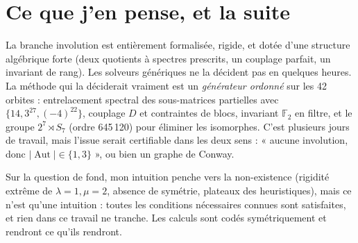 \documentclass[11pt,a4paper]{article}
\theoremstyle{definition}
\theoremstyle{remark}
\newcommand{\F}{\mathbb{F}}
\newcommand{\Aut}{\operatorname{Aut}}
\begin{document}
\section{Ce que j'en pense, et la suite}
La branche involution est entièrement formalisée, rigide, et dotée d'une structure algébrique forte (deux quotients à spectres prescrits, un couplage parfait,
un invariant de rang). Les solveurs génériques ne la décident pas en quelques heures. La méthode qui la déciderait vraiment est un \emph{générateur ordonné}
sur les 42 orbites : entrelacement spectral des sous-matrices partielles avec $\{14,3^{27},(-4)^{22}\}$, couplage $D$ et contraintes de blocs, invariant $\F_2$ en filtre,
et le groupe $2^7\rtimes S_7$ (ordre 645\,120) pour éliminer les isomorphes. C'est plusieurs jours de travail, mais l'issue serait certifiable dans les deux sens :
« aucune involution, donc $|\Aut|\in\{1,3\}$ », ou bien un graphe de Conway.

Sur la question de fond, mon intuition penche vers la non-existence (rigidité extrême de $\lambda=1,\mu=2$, absence de symétrie, plateaux des heuristiques),
mais ce n'est qu'une intuition : toutes les conditions nécessaires connues sont satisfaites, et rien dans ce travail ne tranche. Les calculs sont codés
symétriquement et rendront ce qu'ils rendront.
\end{document}
